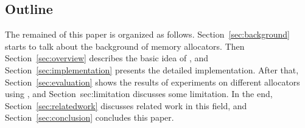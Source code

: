 \subsection*{Outline}

The remained of this paper is organized as follows. Section~\ref{sec:background} starts to talk about the background of memory allocators. Then Section~\ref{sec:overview} describes the basic idea of \MP{}, and Section~\ref{sec:implementation} presents the detailed implementation. After that, Section~\ref{sec:evaluation} shows the results of experiments on different allocators using \MP{}, and Section~{sec:limitation} discusses some limitation. In the end,  Section~\ref{sec:relatedwork} discusses related work in this field, and Section~\ref{sec:conclusion} concludes this paper. 
